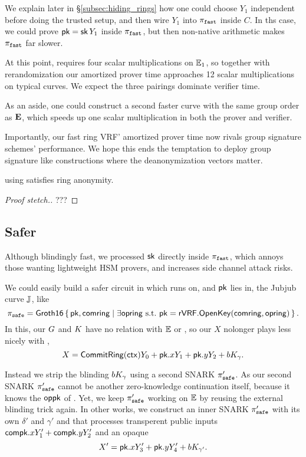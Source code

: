 We explain later in \S\ref{subsec:hiding_rings} how one could
choose $Y_1$ independent before doing the trusted setup,
 and then wire $Y_1$ into $\pi_{\mathtt{fast}}$ inside $C$.
In ths case, we could prove $\mathsf{pk} = \mathsf{sk}\, Y_1$ inside $\pi_{\mathtt{fast}}$, but then
non-native arithmetic makes $\pi_{\mathtt{fast}}$ far slower.

At this point, \PedVRF requires four scalar multiplications on ${\mathbb{E}}_1$,
so together with rerandomization our amortized prover time
 approaches 12 scalar multiplications on typical curves. 
We expect the three pairings dominate verifier time.

As an aside, one could construct a second faster curve with the same
group order as ${\mathbf{E}}$, which speeds up one scalar multiplication
 in both the prover and verifier. 

Importantly, our fast ring VRF' amortized prover time now rivals
group signature schemes' performance.  We hope this ends the temptation
to deploy group signature like constructions where the deanonymization vectors matter.

\begin{proposition}\label{prop:pifast_anonymity}
\rVRF using \pifast satisfies ring anonymity.
\end{proposition}

\begin{proof}[Proof stetch.]
???
\end{proof}

\subsection{Safer}

Although blindingly fast, we processed $\mathsf{sk}$ directly inside $\pi_{\mathtt{fast}}$,
which annoys those wanting lightweight HSM provers, and
increases side channel attack risks.

We could easily build a safer circuit in which
\PedVRF runs on, and $\mathsf{pk}$ lies in, the Jubjub curve ${\mathbb{J}}$, like 
$$ \pisafe = \rrSNARK \Setst{ \pk, \comring }{
 \exists \openring \textrm{\ s.t.\ }
 \pk = \rVRF.\OpenKey(\comring,\openring)
} \mathperiod $$
In this, our $G$ and $K$ have no relation with ${\mathbb{E}}$ or \pisafe,
so our $X$ nolonger plays less nicely with \PedVRF, 
$$ X = {\mathsf{CommitRing}}(\mathsf{ctx}) Y_0 + \mathsf{pk}.x Y_1 + \mathsf{pk}.y Y_2 + b K_\gamma . $$

Instead we strip the blinding $b K_\gamma$ using a second SNARK $\pi_{\mathtt{safe}}'$.
As our second SNARK $\pi_{\mathtt{safe}}'$ cannot be another zero-knowledge continuation
itself, because it knows the $\mathsf{oppk}$ of \PedVRF.
Yet, we keep $\pi_{\mathtt{safe}}'$ working on ${\mathbb{E}}$ by reusing the external blinding
trick again.  In other works, we construct an inner SNARK $\pi_{\mathtt{safe}}'$ with
its own $\delta'$ and $\gamma'$ and that processes
 transperent public inputs $\mathsf{compk}.x Y'_1 + \mathsf{compk}.y Y'_2$ and an opaque
$$ X' = \mathsf{pk}.x Y'_3 + \mathsf{pk}.y Y'_4 + b K_{\gamma'} . $$

